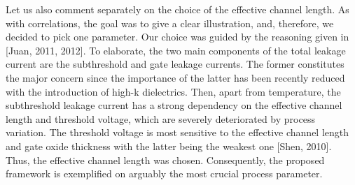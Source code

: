 \begin{authors}
Let us also comment separately on the choice of the effective channel length.
As with correlations, the goal was to give a clear illustration, and, therefore, we decided to pick one parameter.
Our choice was guided by the reasoning given in [Juan, 2011, 2012].
To elaborate, the two main components of the total leakage current are the subthreshold and gate leakage currents.
The former constitutes the major concern since the importance of the latter has been recently reduced with the introduction of high-k dielectrics.
Then, apart from temperature, the subthreshold leakage current has a strong dependency on the effective channel length and threshold voltage, which are severely deteriorated by process variation.
The threshold voltage is most sensitive to the effective channel length and gate oxide thickness with the latter being the weakest one [Shen, 2010].
Thus, the effective channel length was chosen.
Consequently, the proposed framework is exemplified on arguably the most crucial process parameter.

\begin{actions}
\end{actions}
\end{authors}

